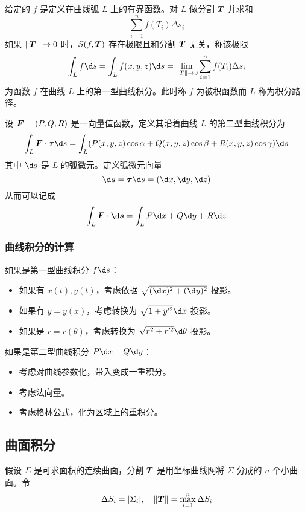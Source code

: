 \begin{definition}[第一型曲线积分]
	给定的 $f$ 是定义在曲线弧 $L$ 上的有界函数。对 $L$ 做分割 $\boldsymbol{T}$ 并求和
	\[ \sum_{i=1}^{n} f(T_i) \Delta s_i \]
	如果 $\|\boldsymbol{T}\| \to 0$ 时，$S(f, \boldsymbol{T})$ 存在极限且和分割 $\boldsymbol{T}$ 无关，称该极限
	\[ \int_L f \d s = \int_{L} f(x, y, z) \d s = \lim_{\|T\| \to 0} \sum_{i=1}^{n} f(T_i) \Delta s_i \]
	为函数 $f$ 在曲线 $L$ 上的第一型曲线积分。此时称 $f$ 为被积函数而 $L$ 称为积分路径。
\end{definition}

\begin{definition}[第二型曲线积分]
	设 $\boldsymbol{F} = (P, Q, R)$ 是一向量值函数，定义其沿着曲线 $L$ 的第二型曲线积分为
	\[ \int_L \vbf{F} \cdot \vbf{\tau} \d s = \int_L (P(x,y,z) \cos \alpha + Q(x, y, z) \cos \beta + R(x, y, z) \cos \gamma) \d s \]
	其中 $\d s$ 是 $L$ 的弧微元。定义弧微元向量
	\[ \d \vbf{s} = \vbf{\tau} \d s = (\d x, \d y, \d z) \]
	从而可以记成
	\[ \int_L \vbf{F} \cdot \d \vbf{s} = \int_L P \d x + Q \d y + R \d z \]
\end{definition}

\subsubsection*{曲线积分的计算}

如果是第一型曲线积分 $f \d s$：
\begin{itemize}
	\item 如果有 $x(t), y(t)$，考虑依据 $\sqrt{(\d x)^2 + (\d y)^2}$ 投影。
	\item 如果有 $y = y(x)$，考虑转换为 $\sqrt{1 + y'^2} \d x$ 投影。
	\item 如果是 $r = r(\theta)$，考虑转换为 $\sqrt{r^2 + r'^2} \d \theta$ 投影。
\end{itemize}

如果是第二型曲线积分 $P \d x + Q \d y$：
\begin{itemize}
	\item 考虑对曲线参数化，带入变成一重积分。
	\item 考虑法向量。
	\item 考虑格林公式，化为区域上的重积分。
\end{itemize}

\subsection{曲面积分}

假设 $\Sigma$ 是可求面积的连续曲面，分割 $\boldsymbol{T}$ 是用坐标曲线网将 $\Sigma$ 分成的 $n$ 个小曲面。令
\[ \Delta S_i = |\Sigma_i|, \quad \|\boldsymbol{T}\| = \max_{i=1}^n \Delta S_i \]



